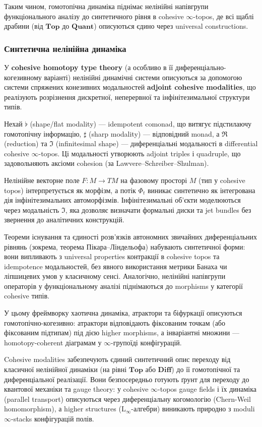\documentclass[a4paper,12pt]{article}
\begin{document}
Таким чином, гомотопічна динаміка піднімає нелінійні напівгрупи функціонального аналізу до синтетичного рівня в cohesive \(\infty\)-topos, де всі щаблі драбини (від \(\mathbf{Top}\) до \(\mathbf{Quant}\)) описуються єдино через universal constructions.

\newpage
\subsubsection{Синтетична нелінійна динаміка}

У \textbf{cohesive homotopy type theory} (а особливо в її диференціально-когезивному варіанті) нелінійні динамічні
системи описуються за допомогою системи спряжених конезивних модальностей \textbf{adjoint cohesive modalities}, що реалізують розрізнення дискретної,
неперервної та інфінітезимальної структури типів.

Нехай \( \flat \) (shape/flat modality) --- idempotent comonad, що витягує підстилаючу гомотопічну інформацію, \( \sharp \) (sharp modality) --- відповідний monad, а \( \Re \) (reduction) та \( \Im \) (infinitesimal shape) --- диференціальні модальності в differential cohesive \(\infty\)-topos. Ці модальності утворюють adjoint triples і quadruple, що задовольняють аксіоми cohesion (за Lawvere–Schreiber–Shulman).

Нелінійне векторне поле \( F : M \to TM \) на фазовому просторі \( M \) (тип у cohesive topos) інтерпретується як морфізм, а потік \( \Phi_t \) виникає синтетично як інтегрована дія інфінітезимальних автоморфізмів. Інфінітезимальні об’єкти моделюються через модальність \( \Im \), яка дозволяє визначати формальні диски та jet bundles без звернення до аналітичних конструкцій.

Теореми існування та єдиності розв’язків автономних звичайних диференціальних рівнянь (зокрема, теорема Пікара–Ліндельофа) набувають синтетичної форми: вони випливають з universal properties контракції в cohesive topos та idempotence модальностей, без явного використання метрики Банаха чи ліпшицевих умов у класичному сенсі. Аналогічно, нелінійні напівгрупи операторів у функціональному аналізі піднімаються до morphisms у категорії cohesive типів.

У цьому фреймворку хаотична динаміка, атрактори та біфуркації описуються гомотопічно-когезивно: атрактори відповідають фіксованим точкам (або фіксованим підтипам) під дією higher morphisms, а інваріантні множини --- homotopy-coherent діаграмам у \(\infty\)-групоїді конфігурацій. 

Cohesive modalities забезпечують єдиний синтетичний опис переходу від класичної нелінійної динаміки (на рівні \(\mathbf{Top}\) або \(\mathbf{Diff}\)) до її гомотопічної та диференціальної реалізації. Вони безпосередньо готують ґрунт для переходу до квантової механіки та gauge theory: у cohesive \(\infty\)-topos gauge fields і їх динаміка (parallel transport) описуються через диференціальну когомологію (Chern-Weil homomorphism), а higher structures (L\(_\infty\)-алгебри) виникають природно з moduli \(\infty\)-stacks конфігурацій полів.
\end{document}

